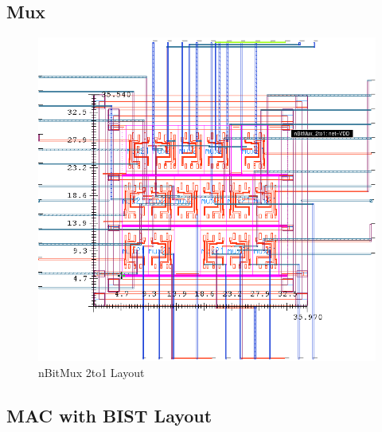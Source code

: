 \documentclass[11pt]{article}
\begin{document}
	\subsection{Mux}
		\begin{figure}[H] 
			\centering 
			\includegraphics[width=\textwidth,height=\dimexpr\textheight-4\baselineskip-\abovecaptionskip-\belowcaptionskip\relax,keepaspectratio]{"Pictures/nBitMux_2to1 Layout"}
			\caption{nBitMux 2to1 Layout} 
			\label{fig:nBitMux-2to1-Layout} 
		\end{figure}
	
	
	
	
	
		
	\subsection{MAC with BIST Layout}
	
\end{document}
